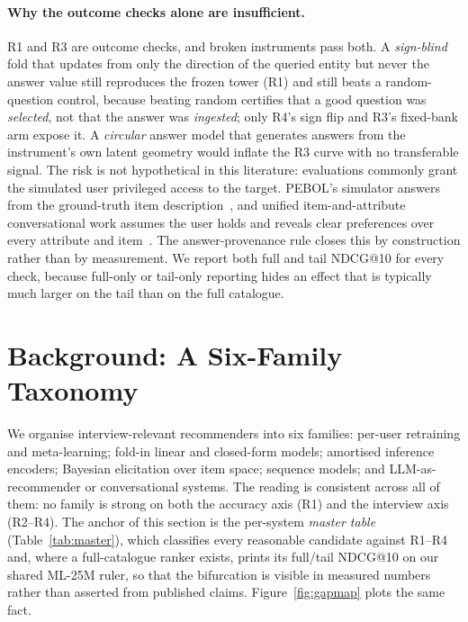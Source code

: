 \documentclass[manuscript,screen]{acmart}
\begin{document}
\paragraph{Why the outcome checks alone are insufficient.} R1 and R3 are outcome checks, and broken instruments pass both. A \emph{sign-blind} fold that updates from only the direction of the queried entity but never the answer value still reproduces the frozen tower (R1) and still beats a random-question control, because beating random certifies that a good question was \emph{selected}, not that the answer was \emph{ingested}; only R4's sign flip and R3's fixed-bank arm expose it. A \emph{circular} answer model that generates answers from the instrument's own latent geometry would inflate the R3 curve with no transferable signal. The risk is not hypothetical in this literature: evaluations commonly grant the simulated user privileged access to the target. PEBOL's simulator answers from the ground-truth item description~\citep{austin2024bayesian}, and unified item-and-attribute conversational work assumes the user holds and reveals clear preferences over every attribute and item~\citep{deng2021unicorn}. The answer-provenance rule closes this by construction rather than by measurement. We report both full and tail NDCG@10 for every check, because full-only or tail-only reporting hides an effect that is typically much larger on the tail than on the full catalogue.

\section{Background: A Six-Family Taxonomy}\label{sec:related}

We organise interview-relevant recommenders into six families: per-user retraining and meta-learning; fold-in linear and closed-form models; amortised inference encoders; Bayesian elicitation over item space; sequence models; and LLM-as-recommender or conversational systems. The reading is consistent across all of them: no family is strong on both the accuracy axis (R1) and the interview axis (R2--R4). The anchor of this section is the per-system \emph{master table} (Table~\ref{tab:master}), which classifies every reasonable candidate against R1--R4 and, where a full-catalogue ranker exists, prints its full/tail NDCG@10 on our shared ML-25M ruler, so that the bifurcation is visible in measured numbers rather than asserted from published claims. Figure~\ref{fig:gapmap} plots the same fact.
\end{document}
